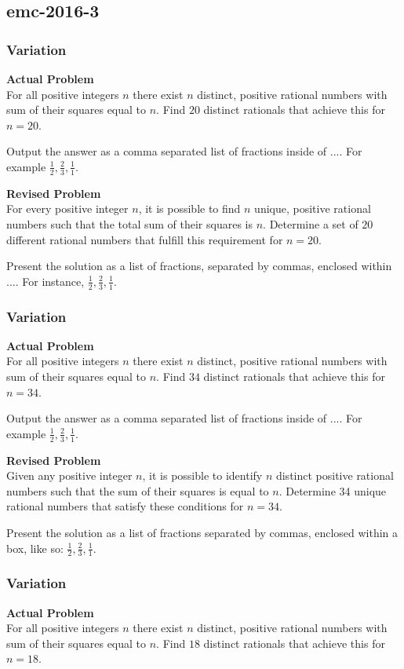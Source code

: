 \subsection{emc-2016-3}
\subsubsection{Variation}
\textbf{Actual Problem}\\
For all positive integers $n$ there exist $n$ distinct, positive rational numbers with sum of their squares equal to $n$. Find $20$ distinct rationals that achieve this for $n = 20$.

Output the answer as a comma separated list of fractions inside of $\boxed{...}$. For example $\boxed{\frac{1}{2}, \frac{2}{3}, \frac{1}{1}}$.

\textbf{Revised Problem}\\
For every positive integer $n$, it is possible to find $n$ unique, positive rational numbers such that the total sum of their squares is $n$. Determine a set of $20$ different rational numbers that fulfill this requirement for $n = 20$.

Present the solution as a list of fractions, separated by commas, enclosed within $\boxed{...}$. For instance, $\boxed{\frac{1}{2}, \frac{2}{3}, \frac{1}{1}}$.

\subsubsection{Variation}
\textbf{Actual Problem}\\
For all positive integers $n$ there exist $n$ distinct, positive rational numbers with sum of their squares equal to $n$. Find $34$ distinct rationals that achieve this for $n = 34$.

Output the answer as a comma separated list of fractions inside of $\boxed{...}$. For example $\boxed{\frac{1}{2}, \frac{2}{3}, \frac{1}{1}}$.

\textbf{Revised Problem}\\
Given any positive integer $n$, it is possible to identify $n$ distinct positive rational numbers such that the sum of their squares is equal to $n$. Determine 34 unique rational numbers that satisfy these conditions for $n = 34$.

Present the solution as a list of fractions separated by commas, enclosed within a box, like so: $\boxed{\frac{1}{2}, \frac{2}{3}, \frac{1}{1}}$.

\subsubsection{Variation}
\textbf{Actual Problem}\\
For all positive integers $n$ there exist $n$ distinct, positive rational numbers with sum of their squares equal to $n$. Find $18$ distinct rationals that achieve this for $n = 18$.

